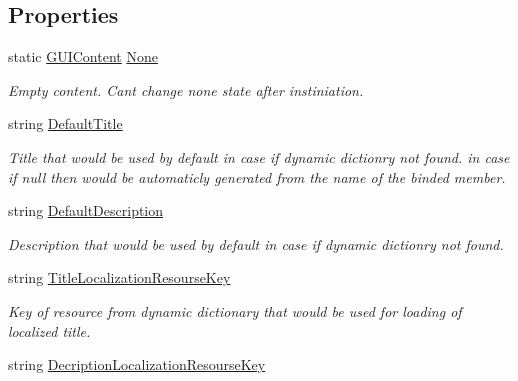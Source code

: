 \subsection*{Properties}
\begin{DoxyCompactItemize}
\item 
static \mbox{\hyperlink{class_wpf_handler_1_1_u_i_1_1_g_u_i_content}{G\+U\+I\+Content}} \mbox{\hyperlink{class_wpf_handler_1_1_u_i_1_1_g_u_i_content_a9d8259c5a572b9ab33faab8166fc6053}{None}}
\begin{DoxyCompactList}\small\item\em Empty content. Can\textquotesingle{}t change none state after instiniation. \end{DoxyCompactList}\item 
string \mbox{\hyperlink{class_wpf_handler_1_1_u_i_1_1_g_u_i_content_afa422133cdb4b7e81ab4041e3bcb93ca}{Default\+Title}}
\begin{DoxyCompactList}\small\item\em Title that would be used by default in case if dynamic dictionry not found. in case if null then would be automaticly generated from the name of the binded member. \end{DoxyCompactList}\item 
string \mbox{\hyperlink{class_wpf_handler_1_1_u_i_1_1_g_u_i_content_afc956b837fa7495d33e25aba7995297b}{Default\+Description}}
\begin{DoxyCompactList}\small\item\em Description that would be used by default in case if dynamic dictionry not found. \end{DoxyCompactList}\item 
string \mbox{\hyperlink{class_wpf_handler_1_1_u_i_1_1_g_u_i_content_a3d8843f4aaceba1bb1174f33c925bab2}{Title\+Localization\+Resourse\+Key}}
\begin{DoxyCompactList}\small\item\em Key of resource from dynamic dictionary that would be used for loading of localized title. \end{DoxyCompactList}\item 
string \mbox{\hyperlink{class_wpf_handler_1_1_u_i_1_1_g_u_i_content_a03f871ffe5fe0858b5be321e356393ee}{Decription\+Localization\+Resourse\+Key}}

\end{DoxyCompactItemize}
